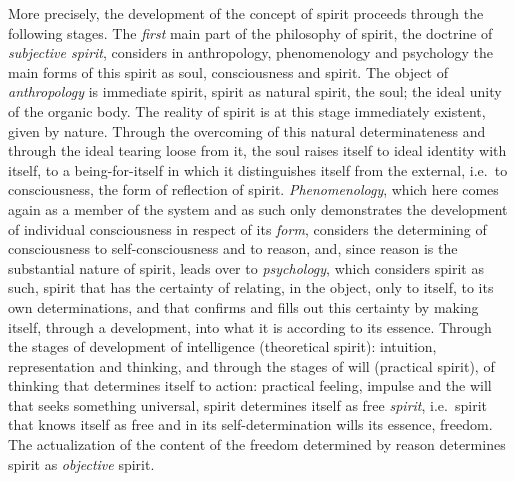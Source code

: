More precisely, the development of the concept of spirit proceeds
through the following stages. The \emph{first} main part of the
philosophy of spirit, the doctrine of \emph{subjective spirit},
considers in anthropology, phenomenology and psychology the main forms
of this spirit as soul, consciousness and spirit. The object of
\emph{anthropology} is immediate spirit, spirit as natural spirit, the
soul; the ideal unity of the organic body. The reality of spirit is at
this stage immediately existent, given by nature. Through the overcoming
of this natural determinateness and through the ideal tearing loose from
it, the soul raises itself to ideal identity with itself, to a
being-for-itself in which it distinguishes itself from the external,
i.e.\ to consciousness, the form of reflection of spirit.
\emph{Phenomenology}, which here comes again as a member of the system
and as such only demonstrates the development of individual
consciousness in respect of its \emph{form}, considers the determining of
consciousness to self-consciousness and to reason, and, since reason is
the substantial nature of spirit, leads over to \emph{psychology}, which
considers spirit as such, spirit that has the certainty of
relating, in the object, only to itself, to its own determinations, and
that confirms and fills out this certainty by making itself, through a
development, into what it is according to its essence. Through the
stages of development
of intelligence (theoretical spirit): intuition, representation and
thinking, and through the stages of will (practical spirit), of thinking
that determines itself to action: practical feeling, impulse and the
will that seeks something universal, spirit determines itself as free
\emph{spirit}, i.e.\ spirit that knows itself as free and in its
self-determination wills its essence, freedom. The actualization of the
content of the freedom determined by reason determines spirit as
\emph{objective} spirit.

